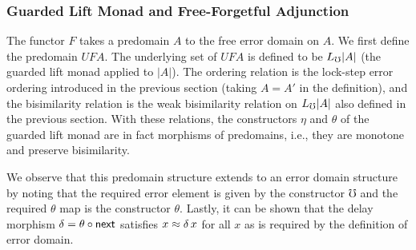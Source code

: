 \begin{comment}
    \inferrule*[right = DnClosed]
    {b_1' \le_{B_1} b_1 \and b_1 \mathbin{d \relcomp d'} b_3}
    {b_1' \mathbin{d \relcomp d'} b_3}

    \inferrule*[right = UpClosed]
    {b_1 \mathbin{d \relcomp d'} b_3 \and b_3 \le_{B_3} b_3'}
    {b_1 \mathbin{d \relcomp d'} b_3'}

    \inferrule*[right = PresErr]
    { }
    {\mho_{B_1} \mathbin{d \relcomp d'} b_3}

    \inferrule*[right = PresTheta]
    {\later_t( \tilde{b_1} \mathbin{d \relcomp d'} \tilde{b_3} ) }
    {\theta_{B_1}(\tilde{b_1}) \mathbin{d \relcomp d'} \theta_{B_3}(\tilde{b_3}) }
\end{mathpar}
%
%



We now describe the squares. Suppose we are given predomains $A_i, A_o, A_i'$,
and $A_o'$, relations $c_i : A_i \rel A_i'$ and $c_o : A_o \rel A_o'$, and
morphisms $f : A_i \to A_o, f' : A_i' \to A_o'$ Given a square with these
morphisms and relations, we say that the square commutes, written $f \le f'$, if
for all $x \in A_i$ and $x' \in A_i'$ with $(x, x') \in c_i$, we have $(f(x),
f'(x')) \in c_o$. We make the analogous definition for error domains.

\end{comment}

\subsubsection{Guarded Lift Monad and Free-Forgetful Adjunction}\label{sec:guarded-lift-monad}

The functor $F$ takes a predomain $A$ to the free error domain on $A$. We first
define the predomain $UFA$. The underlying set of $UFA$ is defined to be $L_\mho
|A|$ (the guarded lift monad applied to $|A|$). The ordering relation is the
lock-step error ordering introduced in the previous section (taking $A = A'$ in
the definition), and the bisimilarity relation is the weak bisimilarity relation
on $L_\mho |A|$ also defined in the previous section. With these relations, the
constructors $\eta$ and $\theta$ of the guarded lift monad are in fact morphisms
of predomains, i.e., they are monotone and preserve bisimilarity.

We observe that this predomain structure extends to an error domain structure by
noting that the required error element is given by the constructor $\mho$ and
the required $\theta$ map is the constructor $\theta$. Lastly, it can be shown
that the delay morphism $\delta = \theta \circ \mathsf{next}$ satisfies $x \approx
\delta\, x$ for all $x$ as is required by the definition of error domain.

